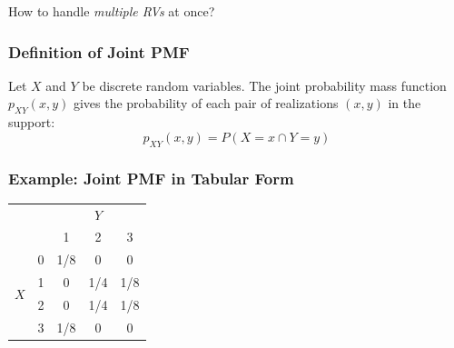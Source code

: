 \documentclass[handout]{beamer}
\begin{document}
\begin{frame}

  \begin{center}
    \huge How to handle \emph{multiple RVs} at once?
  \end{center}

\end{frame}
\begin{frame}
\frametitle{Definition of Joint PMF}
Let $X$ and $Y$ be discrete random variables. The joint probability mass function $p_{XY}(x,y)$ gives the probability of each pair of realizations $(x,y)$ in the support:
\Large
 $$\boxed{p_{XY}(x,y) = P(X = x \cap Y=y)}$$

\end{frame}
\begin{frame}
\frametitle{Example: Joint PMF in Tabular Form}

\begin{table}
\begin{tabular}{|cc|ccc|}
\hline
&&\multicolumn{3}{c|}{$Y$}\\
&&1 & 2&3\\
\hline
\multirow{4}{*}{$X$}
&0& \multicolumn{1}{|c}{\alert{1/8}} & \alert{0}& \alert{0}\\
&1& \multicolumn{1}{|c}{\alert{0}} & \alert{1/4}&\alert{1/8}\\
&2& \multicolumn{1}{|c}{\alert{0}} & \alert{1/4}&\alert{1/8}\\
&3& \multicolumn{1}{|c}{\alert{1/8}} & \alert{0}&\alert{0}\\
\hline
\end{tabular}
\end{table}

\end{frame}
\end{document}
